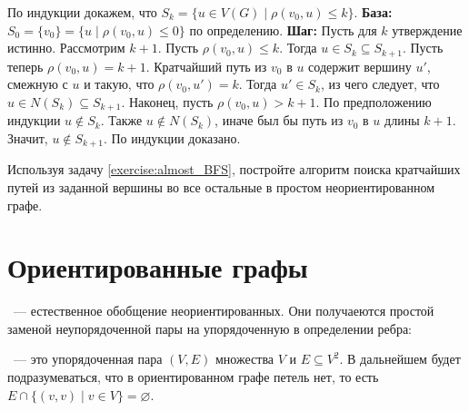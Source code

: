 \begin{Answer}
    \noindent

    По индукции докажем, что $ S_k = \{ u \in V(G) \mid \rho(v_0, u) \leqslant k \} $.
    \newline
    \textbf{База:}
    $ S_0 = \{ v_0 \} = \{ u \mid \rho(v_0, u) \leqslant 0 \} $ по определению.
    \newline
    \textbf{Шаг:}
    Пусть для $ k $ утверждение истинно.
    Рассмотрим $ k + 1 $.
    Пусть $ \rho(v_0, u) \leqslant k $.
    Тогда $ u \in S_k \subseteq S_{k+1} $.
    Пусть теперь $ \rho(v_0, u) = k + 1 $.
    Кратчайший путь из $ v_0 $ в $ u $ содержит вершину $ u' $, смежную с $ u $ и такую, что $ \rho(v_0, u') = k $.
    Тогда $ u' \in S_k $, из чего следует, что $ u \in N(S_k) \subseteq S_{k+1} $.
    Наконец, пусть $ \rho(v_0, u) > k + 1 $.
    По предположению индукции $ u \notin S_k $.
    Также $ u \notin N(S_k) $, иначе был бы путь из $ v_0 $ в $ u $ длины $ k + 1 $.
    Значит, $ u \notin S_{k+1} $.
    \newline
    По индукции доказано.

\end{Answer}

\begin{Exercise}[counter=SecExercise]
    \noindent
    Используя задачу \ref{exercise:almost_BFS}, постройте алгоритм поиска кратчайших путей из заданной вершины во все остальные в простом неориентированном графе.
\end{Exercise}



\newpage



\section{Ориентированные графы}
\label{sec:oriented_graphs}

~--- естественное обобщение неориентированных.
Они получаеются простой заменой неупорядоченной пары на упорядоченную в определении ребра:
\begin{definition}
    ~--- это упорядоченная пара $ (V, E) $ множества  $ V $
    и  $ E \subseteq V^2 $.
    В дальнейшем будет подразумеваться, что в ориентированном графе петель нет, то есть $ E \cap \{(v, v) \mid v \in V \} = \varnothing $.
\end{definition}

